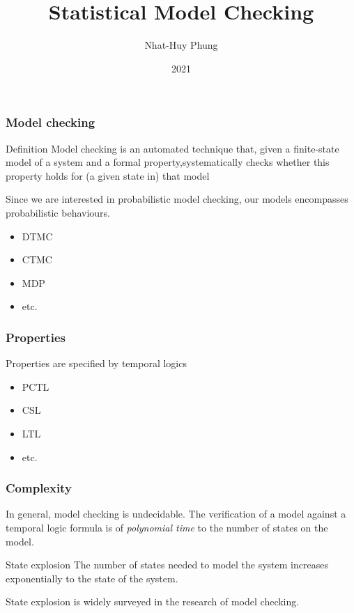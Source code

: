 \documentclass{beamer}
\title{Statistical Model Checking}
\author{Nhat-Huy Phung}
\institute{University of Constance}
\date{2021}
\begin{document}
\frame{\titlepage}

\begin{frame}
    \frametitle{Model checking}
    \begin{block}{Definition}
        Model checking is an automated technique that, given a finite-state model of a system and a formal property,systematically checks whether this property holds for (a given state in) that model
    \end{block}
    Since we are interested in probabilistic model checking, our models encompasses probabilistic behaviours.
    \begin{examples}
        \begin{itemize}
            \item DTMC
            \item CTMC
            \item MDP
            \item etc.
        \end{itemize}
    \end{examples}
\end{frame}


\begin{frame}
    \frametitle{Properties}
    Properties are specified by temporal logics
    \begin{examples}
        \begin{itemize}
            \item PCTL
            \item CSL
            \item LTL
            \item etc.
        \end{itemize}
    \end{examples}
\end{frame}

\begin{frame}
    \frametitle{Complexity}
    In general, model checking is undecidable. The verification of a model against a temporal logic formula is of \textit{polynomial time} to the number of states on the model.
    \begin{block}{State explosion}
        The number of states needed to model the system increases exponentially to the state of the system.
    \end{block}
    State explosion is widely surveyed in the research of model checking. \cite{clarke2011model}
\end{frame}
\end{document}
